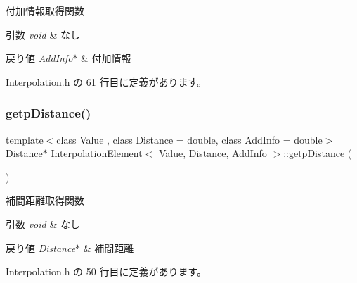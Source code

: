 付加情報取得関数 


\begin{DoxyParams}{引数}
{\em void} & なし \\
\hline
\end{DoxyParams}

\begin{DoxyRetVals}{戻り値}
{\em Add\+Info$\ast$} & 付加情報 \\
\hline
\end{DoxyRetVals}


 Interpolation.\+h の 61 行目に定義があります。

\mbox{\label{class_interpolation_element_a7f203d40a738a537582e6996c8ee8dda}} 
\subsubsection{\texorpdfstring{getp\+Distance()}{getpDistance()}}
{\footnotesize\ttfamily template$<$class Value , class Distance  = double, class Add\+Info  = double$>$ \\
Distance$\ast$ \mbox{\hyperlink{class_interpolation_element}{Interpolation\+Element}}$<$ Value, Distance, Add\+Info $>$\+::getp\+Distance (\begin{DoxyParamCaption}{ }\end{DoxyParamCaption})\hspace{0.3cm}{\ttfamily [inline]}}



補間距離取得関数 


\begin{DoxyParams}{引数}
{\em void} & なし \\
\hline
\end{DoxyParams}

\begin{DoxyRetVals}{戻り値}
{\em Distance$\ast$} & 補間距離 \\
\hline
\end{DoxyRetVals}


 Interpolation.\+h の 50 行目に定義があります。

\mbox{\label{class_interpolation_element_afd5a4d717599f5bd681eb72365af9b39}} 
